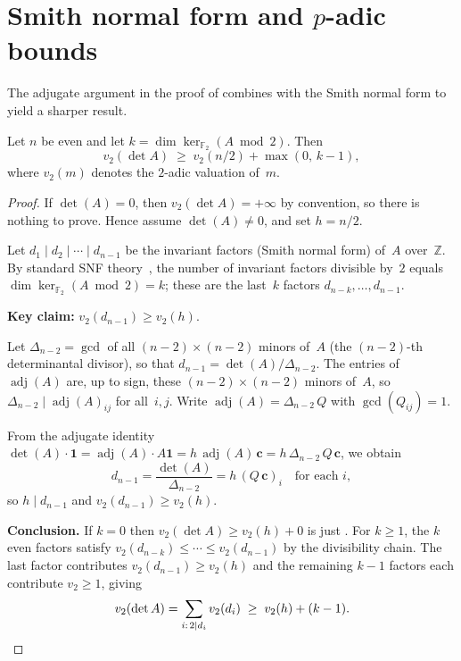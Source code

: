 \documentclass[11pt,a4paper]{article}
\newcommand{\ZZ}{\mathbb{Z}}
\newcommand{\FF}{\mathbb{F}}
\newcommand{\one}{\mathbf{1}}
\newcommand{\adj}{\operatorname{adj}}
\begin{document}
\section{\texorpdfstring{Smith normal form and $p$-adic bounds}{Smith normal form and p-adic bounds}}\label{sec:snf}

The adjugate argument in the proof of 
combines with the Smith normal form to yield a sharper result.

\begin{theorem}\label{thm:sharp-v2}
Let $n$ be even and let $k=\dim\ker_{\FF_2}(A\bmod 2)$.  Then
\[
  v_2(\det A)\;\ge\; v_2(n/2)+\max(0,\,k-1),
\]
where $v_2(m)$ denotes the $2$-adic valuation of~$m$.
\end{theorem}

\begin{proof}
If $\det(A)=0$, then $v_2(\det A)=+\infty$ by convention, so there is
nothing to prove.  Hence assume $\det(A)\neq 0$, and set $h=n/2$.

Let $d_1\mid d_2\mid\cdots\mid d_{n-1}$ be the invariant factors
(Smith normal form) of~$A$ over~$\ZZ$.
By standard SNF theory~\cite{Newman72}, the number of invariant
factors divisible by~$2$ equals $\dim\ker_{\FF_2}(A\bmod 2)=k$;
these are the last~$k$ factors $d_{n-k},\ldots,d_{n-1}$.

\medskip\noindent\textbf{Key claim:} $v_2(d_{n-1})\ge v_2(h)$.

\smallskip\noindent
Let $\Delta_{n-2}=\gcd$ of all $(n{-}2)\times(n{-}2)$ minors of~$A$
(the $(n{-}2)$-th determinantal divisor), so that
$d_{n-1}=\det(A)/\Delta_{n-2}$.
The entries of $\adj(A)$ are, up to sign, these $(n{-}2)\times(n{-}2)$
minors of~$A$, so $\Delta_{n-2}\mid\adj(A)_{ij}$ for all~$i,j$.
Write $\adj(A)=\Delta_{n-2}\,Q$ with $\gcd(Q_{ij})=1$.

From the adjugate identity $\det(A)\cdot\one=\adj(A)\cdot A\one
=h\,\adj(A)\,\mathbf{c}=h\,\Delta_{n-2}\,Q\,\mathbf{c}$,
we obtain
\[
  d_{n-1}=\frac{\det(A)}{\Delta_{n-2}}=h\,(Q\,\mathbf{c})_i
  \quad\text{for each }i,
\]
so $h\mid d_{n-1}$ and $v_2(d_{n-1})\ge v_2(h)$.

\medskip\noindent\textbf{Conclusion.}
If $k=0$ then $v_2(\det A)\ge v_2(h)+0$ is just .
For $k\ge 1$, the $k$ even factors satisfy
$v_2(d_{n-k})\le\cdots\le v_2(d_{n-1})$ by the divisibility chain.
The last factor contributes $v_2(d_{n-1})\ge v_2(h)$ and the remaining
$k-1$ factors each contribute $v_2\ge 1$, giving
\[
  v_2(\det A)=\sum_{i:\,2\mid d_i}v_2(d_i)
  \;\ge\; v_2(h)+(k-1).  \qedhere
\]
\end{proof}
\end{document}
